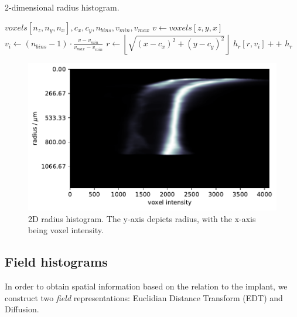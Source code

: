 \begin{algorithm}
    \caption{2-dimensional radius histogram.}
    \label{alg:2dhists}
    \begin{algorithmic}
         {$voxels[n_z,n_y,n_x],c_x,c_y,n_{bins},v_{min},v_{max}$}
                \State $v \gets voxels[z,y,x]$
                    \State $v_{i} \gets (n_{bins}-1) \cdot \frac{v - v_{min}}{v_{max} - v_{min}}$
                    \State $r \gets \left\lfloor\sqrt{(x-c_x)^2 + (y-c_y)^2}\right\rfloor$
                    \State $h_r[r,v_{i}]{+}{+}$
                \EndIf
            \EndFor
            \Return $h_r$
        \EndFunction
    \end{algorithmic}
\end{algorithm}

\begin{figure}
    \centering
    \includegraphics[width=\linewidth]{figures/rb-bone_region3.pdf}
    \caption{2D radius histogram. The y-axis depicts radius, with the x-axis being voxel intensity.}
    \label{fig:2dhists}
\end{figure}

\subsection{Field histograms}
In order to obtain spatial information based on the relation to the implant, we construct two \textit{field} representations: Euclidian Distance Transform (EDT) and Diffusion.

